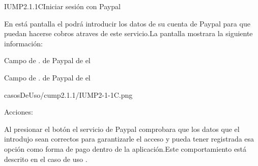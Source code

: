\begin{IU}{IUMP2.1.1C}{Iniciar sesión con Paypal}{En está pantalla el  podrá introducir los datos de su cuenta de Paypal para que puedan hacerse cobros atraves de este servicio.La pantalla mostrara la siguiente información:
	\begin{Citemize}
		\item Campo de . de Paypal de el 
		\item  Campo de . de Paypal de el 
	\end{Citemize}}
{casosDeUso/cump2.1.1/IUMP2-1-1C.png}
	\item[Acciones:]
		\item {}Al presionar el botón el servicio de Paypal comprobara que los datos que el  introdujo sean correctos para garantizarle el acceso y pueda tener registrada esa opción como forma de pago dentro de la aplicación.Este comportamiento está descrito en el caso de uso .
\end{IU}